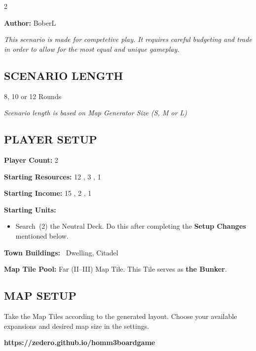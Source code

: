 
\begin{multicols}{2}

\textbf{Author:} BoberL

\textit{This scenario is made for competetive play. It requires careful budgeting and trade in order to allow for the most equal and unique gameplay.} %

\subsection*{\MakeUppercase{Scenario Length}}

8, 10 or 12 Rounds

\textit{Scenario length is based on Map Generator Size (S, M or L)}

\subsection*{\MakeUppercase{Player Setup}}

\textbf{Player Count:} 2

\textbf{Starting Resources:} 12 , 3 , 1 

\textbf{Starting Income:} 15 , 2 , 1 

\textbf{Starting Units:}
\begin{itemize}
  \item Search~(2) the  Neutral Deck. Do this after completing the \textbf{Setup Changes} mentioned below.
\end{itemize}

\textbf{Town Buildings:} ~Dwelling, Citadel

\textbf{Map Tile Pool:} Far (II--III) Map Tile. This Tile serves as \textbf{the Bunker}.

\subsection*{\MakeUppercase{Map Setup}}

Take the Map Tiles according to the generated layout. Choose your available expansions and desired map size in the settings.

\textbf{https://zedero.github.io/homm3boardgame}

\columnbreak


\end{multicols}
